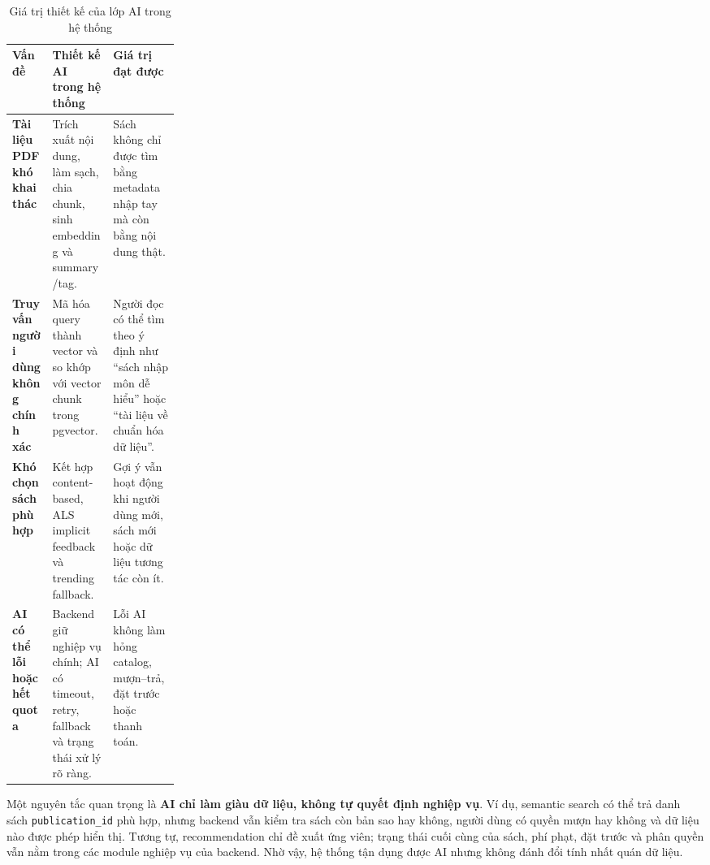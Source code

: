 \begin{table}[H]
\centering
\small
\renewcommand{\arraystretch}{1.16}
\setlength{\tabcolsep}{5pt}
\begin{tabularx}{\linewidth}{|>{\bfseries}p{0.24\linewidth}|>{\raggedright\arraybackslash}X|>{\raggedright\arraybackslash}X|}
\hline
\textbf{Vấn đề} & \textbf{Thiết kế AI trong hệ thống} & \textbf{Giá trị đạt được} \\
\hline
Tài liệu PDF khó khai thác & Trích xuất nội dung, làm sạch, chia chunk, sinh embedding và summary/tag. & Sách không chỉ được tìm bằng metadata nhập tay mà còn bằng nội dung thật. \\
\hline
Truy vấn người dùng không chính xác & Mã hóa query thành vector và so khớp với vector chunk trong pgvector. & Người đọc có thể tìm theo ý định như ``sách nhập môn dễ hiểu'' hoặc ``tài liệu về chuẩn hóa dữ liệu''. \\
\hline
Khó chọn sách phù hợp & Kết hợp content-based, ALS implicit feedback và trending fallback. & Gợi ý vẫn hoạt động khi người dùng mới, sách mới hoặc dữ liệu tương tác còn ít. \\
\hline
AI có thể lỗi hoặc hết quota & Backend giữ nghiệp vụ chính; AI có timeout, retry, fallback và trạng thái xử lý rõ ràng. & Lỗi AI không làm hỏng catalog, mượn--trả, đặt trước hoặc thanh toán. \\
\hline
\end{tabularx}
\caption{Giá trị thiết kế của lớp AI trong hệ thống}
\label{tab:ai_design_value}
\end{table}

Một nguyên tắc quan trọng là \textbf{AI chỉ làm giàu dữ liệu, không tự quyết định
nghiệp vụ}. Ví dụ, semantic search có thể trả danh sách \texttt{publication\_id}
phù hợp, nhưng backend vẫn kiểm tra sách còn bản sao hay không, người dùng có
quyền mượn hay không và dữ liệu nào được phép hiển thị. Tương tự, recommendation
chỉ đề xuất ứng viên; trạng thái cuối cùng của sách, phí phạt, đặt trước và phân
quyền vẫn nằm trong các module nghiệp vụ của backend. Nhờ vậy, hệ thống tận dụng
được AI nhưng không đánh đổi tính nhất quán dữ liệu.


